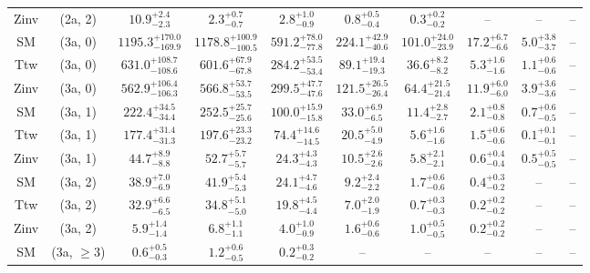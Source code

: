 \begin{table}[h!]
{\begin{tabular}{cccccccccc}
	Zinv & (2a, 2) & $10.9^{+ 2.4 }_{- 2.3 }$ & $2.3^{+ 0.7 }_{- 0.7 }$ & $2.8^{+ 1.0 }_{- 0.9 }$ & $0.8^{+ 0.5 }_{- 0.4 }$ & $0.3^{+ 0.2 }_{- 0.2 }$ & -- & -- & -- \\[0.5ex] 
	SM & (3a, 0) & $1195.3^{+ 170.0 }_{- 169.9 }$ & $1178.8^{+ 100.9 }_{- 100.5 }$ & $591.2^{+ 78.0 }_{- 77.8 }$ & $224.1^{+ 42.9 }_{- 40.6 }$ & $101.0^{+ 24.0 }_{- 23.9 }$ & $17.2^{+ 6.7 }_{- 6.6 }$ & $5.0^{+ 3.8 }_{- 3.7 }$ & -- \\[0.5ex] 
	Ttw & (3a, 0) & $631.0^{+ 108.7 }_{- 108.6 }$ & $601.6^{+ 67.9 }_{- 67.8 }$ & $284.2^{+ 53.5 }_{- 53.4 }$ & $89.1^{+ 19.4 }_{- 19.3 }$ & $36.6^{+ 8.2 }_{- 8.2 }$ & $5.3^{+ 1.6 }_{- 1.6 }$ & $1.1^{+ 0.6 }_{- 0.6 }$ & -- \\[0.5ex] 
	Zinv & (3a, 0) & $562.9^{+ 106.4 }_{- 106.3 }$ & $566.8^{+ 53.7 }_{- 53.5 }$ & $299.5^{+ 47.7 }_{- 47.6 }$ & $121.5^{+ 26.5 }_{- 26.4 }$ & $64.4^{+ 21.5 }_{- 21.4 }$ & $11.9^{+ 6.0 }_{- 6.0 }$ & $3.9^{+ 3.6 }_{- 3.6 }$ & -- \\[0.5ex] 
	SM & (3a, 1) & $222.4^{+ 34.5 }_{- 34.4 }$ & $252.5^{+ 25.7 }_{- 25.6 }$ & $100.0^{+ 15.9 }_{- 15.8 }$ & $33.0^{+ 6.9 }_{- 6.5 }$ & $11.4^{+ 2.8 }_{- 2.7 }$ & $2.1^{+ 0.8 }_{- 0.8 }$ & $0.7^{+ 0.6 }_{- 0.5 }$ & -- \\[0.5ex] 
	Ttw & (3a, 1) & $177.4^{+ 31.4 }_{- 31.3 }$ & $197.6^{+ 23.3 }_{- 23.2 }$ & $74.4^{+ 14.6 }_{- 14.5 }$ & $20.5^{+ 5.0 }_{- 4.9 }$ & $5.6^{+ 1.6 }_{- 1.6 }$ & $1.5^{+ 0.6 }_{- 0.6 }$ & $0.1^{+ 0.1 }_{- 0.1 }$ & -- \\[0.5ex] 
	Zinv & (3a, 1) & $44.7^{+ 8.9 }_{- 8.8 }$ & $52.7^{+ 5.7 }_{- 5.7 }$ & $24.3^{+ 4.3 }_{- 4.3 }$ & $10.5^{+ 2.6 }_{- 2.6 }$ & $5.8^{+ 2.1 }_{- 2.1 }$ & $0.6^{+ 0.4 }_{- 0.4 }$ & $0.5^{+ 0.5 }_{- 0.5 }$ & -- \\[0.5ex] 
	SM & (3a, 2) & $38.9^{+ 7.0 }_{- 6.9 }$ & $41.9^{+ 5.4 }_{- 5.3 }$ & $24.1^{+ 4.7 }_{- 4.6 }$ & $9.2^{+ 2.4 }_{- 2.2 }$ & $1.7^{+ 0.6 }_{- 0.6 }$ & $0.4^{+ 0.3 }_{- 0.2 }$ & -- & -- \\[0.5ex] 
	Ttw & (3a, 2) & $32.9^{+ 6.6 }_{- 6.5 }$ & $34.8^{+ 5.1 }_{- 5.0 }$ & $19.8^{+ 4.5 }_{- 4.4 }$ & $7.0^{+ 2.0 }_{- 1.9 }$ & $0.7^{+ 0.3 }_{- 0.3 }$ & $0.2^{+ 0.2 }_{- 0.2 }$ & -- & -- \\[0.5ex] 
	Zinv & (3a, 2) & $5.9^{+ 1.4 }_{- 1.4 }$ & $6.8^{+ 1.1 }_{- 1.1 }$ & $4.0^{+ 1.0 }_{- 0.9 }$ & $1.6^{+ 0.6 }_{- 0.6 }$ & $1.0^{+ 0.5 }_{- 0.5 }$ & $0.2^{+ 0.2 }_{- 0.2 }$ & -- & -- \\[0.5ex] 
	SM & (3a, $\ge3$) & $0.6^{+ 0.5 }_{- 0.3 }$ & $1.2^{+ 0.6 }_{- 0.5 }$ & $0.2^{+ 0.3 }_{- 0.2 }$ & -- & -- & -- & -- & -- \\[0.5ex] 

\end{tabular}}
\end{table}
